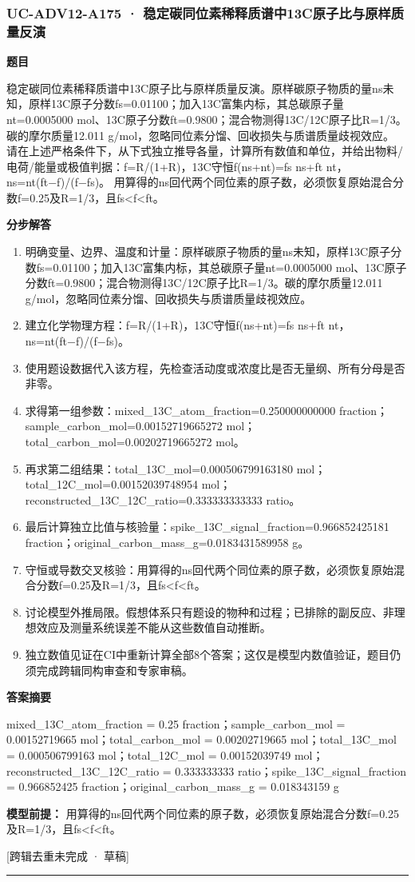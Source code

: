 \documentclass[UTF8,11pt,a4paper]{ctexart}
\begin{document}
\subsubsection*{UC-ADV12-A175 · 稳定碳同位素稀释质谱中13C原子比与原样质量反演}
\noindent\textbf{题目}\par
稳定碳同位素稀释质谱中13C原子比与原样质量反演。原样碳原子物质的量ns未知，原样13C原子分数fs=0.01100；加入13C富集内标，其总碳原子量nt=0.0005000 mol、13C原子分数ft=0.9800；混合物测得13C/12C原子比R=1/3。碳的摩尔质量12.011 g/mol，忽略同位素分馏、回收损失与质谱质量歧视效应。 请在上述严格条件下，从下式独立推导各量，计算所有数值和单位，并给出物料/电荷/能量或极值判据：f=R/(1+R)，13C守恒f(ns+nt)=fs ns+ft nt，ns=nt(ft−f)/(f−fs)。 用算得的ns回代两个同位素的原子数，必须恢复原始混合分数f=0.25及R=1/3，且fs<f<ft。\par
\medskip\noindent\textbf{分步解答}
\begin{enumerate}
\item 明确变量、边界、温度和计量：原样碳原子物质的量ns未知，原样13C原子分数fs=0.01100；加入13C富集内标，其总碳原子量nt=0.0005000 mol、13C原子分数ft=0.9800；混合物测得13C/12C原子比R=1/3。碳的摩尔质量12.011 g/mol，忽略同位素分馏、回收损失与质谱质量歧视效应。
\item 建立化学物理方程：f=R/(1+R)，13C守恒f(ns+nt)=fs ns+ft nt，ns=nt(ft−f)/(f−fs)。
\item 使用题设数据代入该方程，先检查活动度或浓度比是否无量纲、所有分母是否非零。
\item 求得第一组参数：mixed\_13C\_atom\_fraction=0.250000000000 fraction；sample\_carbon\_mol=0.00152719665272 mol；total\_carbon\_mol=0.00202719665272 mol。
\item 再求第二组结果：total\_13C\_mol=0.000506799163180 mol；total\_12C\_mol=0.00152039748954 mol；reconstructed\_13C\_12C\_ratio=0.333333333333 ratio。
\item 最后计算独立比值与核验量：spike\_13C\_signal\_fraction=0.966852425181 fraction；original\_carbon\_mass\_g=0.0183431589958 g。
\item 守恒或导数交叉核验：用算得的ns回代两个同位素的原子数，必须恢复原始混合分数f=0.25及R=1/3，且fs<f<ft。
\item 讨论模型外推局限。假想体系只有题设的物种和过程；已排除的副反应、非理想效应及测量系统误差不能从这些数值自动推断。
\item 独立数值见证在CI中重新计算全部8个答案；这仅是模型内数值验证，题目仍须完成跨辑同构审查和专家审稿。
\end{enumerate}
\noindent\textbf{答案摘要}\par
mixed\_13C\_atom\_fraction = 0.25 fraction；sample\_carbon\_mol = 0.00152719665 mol；total\_carbon\_mol = 0.00202719665 mol；total\_13C\_mol = 0.000506799163 mol；total\_12C\_mol = 0.00152039749 mol；reconstructed\_13C\_12C\_ratio = 0.333333333 ratio；spike\_13C\_signal\_fraction = 0.966852425 fraction；original\_carbon\_mass\_g = 0.018343159 g\par
\noindent\textbf{模型前提：}
用算得的ns回代两个同位素的原子数，必须恢复原始混合分数f=0.25及R=1/3，且fs<f<ft。\par
\noindent\textcolor{red!65!black}{[跨辑去重未完成 · 草稿]} \par
\medskip\hrule\medskip
\end{document}
